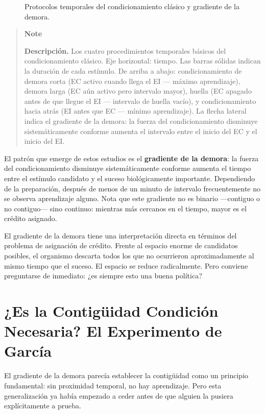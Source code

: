 \documentclass[
  letterpaper,
  DIV=11,
  numbers=noendperiod]{scrreprt}
\begin{document}
\begin{tcolorbox}[enhanced jigsaw, arc=.35mm, bottomrule=.15mm, breakable, colback=white, colframe=quarto-callout-note-color-frame, left=2mm, leftrule=.75mm, opacityback=0, rightrule=.15mm, toprule=.15mm]
\begin{figure}[H]
{}

\caption{\label{fig-protocolos_temporales}Protocolos temporales del
condicionamiento clásico y gradiente de la demora.}

\end{figure}%

\begin{quote}
\textbf{Note}

\textbf{Descripción.} Los cuatro procedimientos temporales básicos del
condicionamiento clásico. Eje horizontal: tiempo. Las barras sólidas
indican la duración de cada estímulo. De arriba a abajo:
condicionamiento de demora corta (EC activo cuando llega el EI ---
máximo aprendizaje), demora larga (EC aún activo pero intervalo mayor),
huella (EC apagado antes de que llegue el EI --- intervalo de huella
vacío), y condicionamiento hacia atrás (EI antes que EC --- mínimo
aprendizaje). La flecha lateral indica el gradiente de la demora: la
fuerza del condicionamiento disminuye sistemáticamente conforme aumenta
el intervalo entre el inicio del EC y el inicio del EI.
\end{quote}

El patrón que emerge de estos estudios es el \textbf{gradiente de la
demora}: la fuerza del condicionamiento disminuye sistemáticamente
conforme aumenta el tiempo entre el estímulo candidato y el suceso
biológicamente importante. Dependiendo de la preparación, después de
menos de un minuto de intervalo frecuentemente no se observa aprendizaje
alguno. Nota que este gradiente no es binario ---contiguo o no
contiguo--- sino continuo: mientras más cercanos en el tiempo, mayor es
el crédito asignado.

El gradiente de la demora tiene una interpretación directa en términos
del problema de asignación de crédito. Frente al espacio enorme de
candidatos posibles, el organismo descarta todos los que no ocurrieron
aproximadamente al mismo tiempo que el suceso. El espacio se reduce
radicalmente. Pero conviene preguntarse de inmediato: ¿es siempre esto
una buena política?

\section{¿Es la Contigüidad Condición Necesaria? El Experimento de
García}\label{es-la-contiguxfcidad-condiciuxf3n-necesaria-el-experimento-de-garcuxeda}

El gradiente de la demora parecía establecer la contigüidad como un
principio fundamental: sin proximidad temporal, no hay aprendizaje. Pero
esta generalización ya había empezado a ceder antes de que alguien la
pusiera explícitamente a prueba.


\end{tcolorbox}
\end{document}
